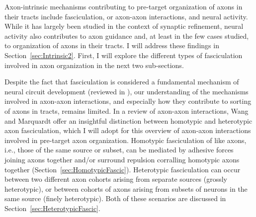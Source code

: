 Axon-intrinsic mechanisms contributing to pre-target organization of axons in their tracts include fasciculation, or axon-axon interactions, and neural activity.
While it has largely been studied in the context of synaptic refinement, neural activity also contributes to axon guidance and, at least in the few cases studied, to organization of axons in their tracts.
I will address these findings in Section~\ref{sec:Intrinsic2}.
First, I will explore the different types of fasciculation involved in axon organization in the next two sub-sections.

Despite the fact that fasciculation is considered a fundamental mechanism of neural circuit development (reviewed in ), our understanding of the mechanisms involved in axon-axon interactions, and especially how they contribute to sorting of axons in tracts, remains limited.
In a review of axon-axon interactions, Wang and Marquardt  offer an insightful distinction between homotypic and heterotypic axon fasciculation, which I will adopt for this overview of axon-axon interactions involved in pre-target axon organization. 
Homotypic fasciculation of like axons, i.e., those of the same source or subset, can be mediated by adhesive forces joining axons together and/or surround repulsion corralling homotypic axons together (Section~\ref{sec:HomotypicFascic}).
Heterotypic fasciculation can occur between two different axon cohorts arising from separate sources (grossly heterotypic), or between cohorts of axons arising from subsets of neurons in the same source (finely heterotypic).
Both of these scenarios are discussed in Section~\ref{sec:HeterotypicFascic}.